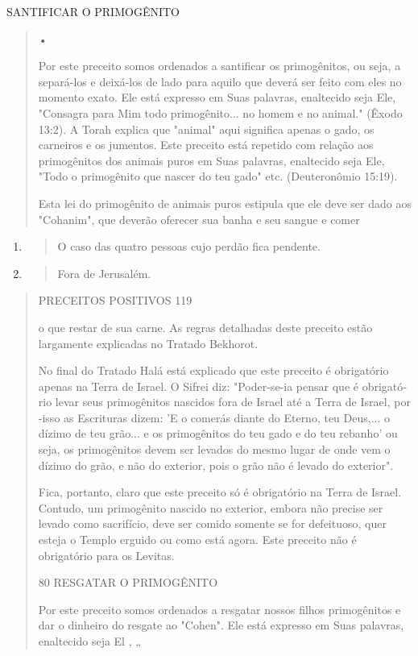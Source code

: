 SANTIFICAR O PRIMOGÊNITO

\begin{quote}
•

Por este preceito somos ordenados a santificar os primogênitos, ou seja,
a separá-los e deixá-los de lado para aquilo que deverá ser feito com
eles no momento exato. Ele está expresso em Suas palavras, enaltecido
seja Ele, "Con­sagra para Mim todo primogênito... no homem e no animal."
(Êxodo 13:2). A Torah explica que "animal" aqui significa apenas o gado,
os carneiros e os ju­mentos. Este preceito está repetido com relação aos
primogênitos dos animais puros em Suas palavras, enaltecido seja Ele,
"Todo o primogênito que nascer do teu gado" etc. (Deuteronômio 15:19).

Esta lei do primogênito de animais puros estipula que ele deve ser dado
aos "Cohanim", que deverão oferecer sua banha e seu sangue e comer
\end{quote}

\begin{enumerate}
\def\labelenumi{\arabic{enumi}.}
\setcounter{enumi}{100}
\item
  \begin{quote}
  O caso das quatro pessoas cujo perdão fica pendente.
  \end{quote}
\item
  \begin{quote}
  Fora de Jerusalém.
  \end{quote}
\end{enumerate}

\begin{quote}
PRECEITOS POSITIVOS 119

o que restar de sua carne. As regras detalhadas deste preceito estão
largamente explicadas no Tratado Bekhorot.

No final do Tratado Halá está explicado que este preceito é obriga­tório
apenas na Terra de Israel. O Sifrei diz: "Poder-se-ia pensar que é
obrigató­rio levar seus primogênitos nascidos fora de Israel até a Terra
de Israel, por -isso as Escrituras dizem: 'E o comerás diante do Eterno,
teu Deus,... o dízimo de teu grão... e os primogênitos do teu gado e do
teu rebanho' ou seja, os primo­gênitos devem ser levados do mesmo lugar
de onde vem o dízimo do grão, e não do exterior, pois o grão não é
levado do exterior".

Fica, portanto, claro que este preceito só é obrigatório na Terra de
Israel. Contudo, um primogênito nascido no exterior, embora não precise
ser levado como sacrifício, deve ser comido somente se for defeituoso,
quer esteja o Templo erguido ou como está agora. Este preceito não é
obrigatório para os Levitas.

80 RESGATAR O PRIMOGÊNITO

Por este preceito somos ordenados a resgatar nossos filhos primogê­nitos
e dar o dinheiro do resgate ao "Cohen". Ele está expresso em Suas
palavras, enaltecido seja El , „
\end{quote}

